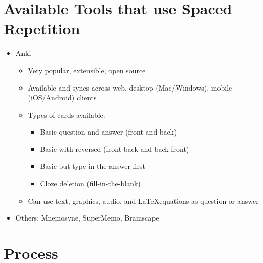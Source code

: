 \documentclass[]{tufte-handout}
\begin{document}
\section{Available Tools that use Spaced Repetition}

\begin{itemize}
	\item Anki\cite{anki}
	\begin{itemize}
		\item Very popular, extensible, open source
		\item Available and syncs across web, desktop (Mac/Windows), mobile (iOS/Android) clients
		\item Types of cards available:
		\begin{itemize}
			\item Basic question and answer (front and back)
			\item Basic with reversed (front-back and back-front)
			\item Basic but type in the answer first
			\item Cloze deletion (fill-in-the-blank)
		\end{itemize}
		\item Can use text, graphics, audio, and \LaTeX equations as question or answer
	\end{itemize}
	\item Others: Mnemosyne, SuperMemo, Brainscape
\end{itemize}

\section{Process}
\end{document}
